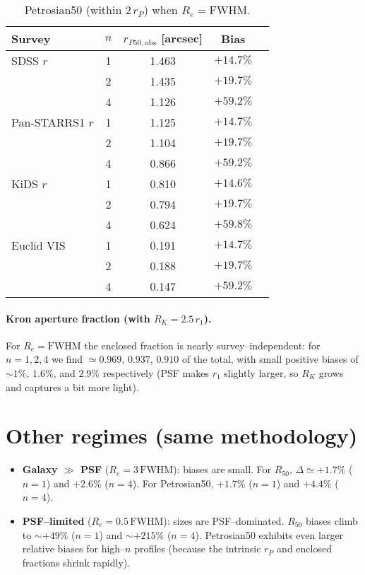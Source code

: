 \documentclass[12pt]{article}
\begin{document}
\begin{table}[t]
\centering
\small
\caption{Petrosian50 (within $2\,r_P$) when $R_e=\mathrm{FWHM}$.}
\begin{tabular}{lcccc}
\hline
Survey & $n$ & $r_{P50,\mathrm{obs}}$ [arcsec] & Bias \\
\hline
SDSS $r$ & 1 & 1.463 & $+14.7\%$ \\
         & 2 & 1.435 & $+19.7\%$ \\
         & 4 & 1.126 & $+59.2\%$ \\
Pan-STARRS1 $r$ & 1 & 1.125 & $+14.7\%$ \\
                 & 2 & 1.104 & $+19.7\%$ \\
                 & 4 & 0.866 & $+59.2\%$ \\
KiDS $r$ & 1 & 0.810 & $+14.6\%$ \\
         & 2 & 0.794 & $+19.7\%$ \\
         & 4 & 0.624 & $+59.8\%$ \\
Euclid VIS & 1 & 0.191 & $+14.7\%$ \\
           & 2 & 0.188 & $+19.7\%$ \\
           & 4 & 0.147 & $+59.2\%$ \\
\hline
\end{tabular}
\end{table}

\paragraph{Kron aperture fraction (with $R_K=2.5\,r_1$).}
For $R_e=\mathrm{FWHM}$ the enclosed fraction is nearly survey–independent: for $n=1,2,4$ we find $\simeq 0.969,\,0.937,\,0.910$ of the total, with small positive biases of $\sim 1\%$, $1.6\%$, and $2.9\%$ respectively (PSF makes $r_1$ slightly larger, so $R_K$ grows and captures a bit more light).

\section*{Other regimes (same methodology)}
\begin{itemize}
\item \textbf{Galaxy $\gg$ PSF} ($R_e=3\,\mathrm{FWHM}$): biases are small. For $R_{50}$, $\Delta\simeq+1.7\%$ ($n{=}1$) and $+2.6\%$ ($n{=}4$). For Petrosian50, $+1.7\%$ ($n{=}1$) and $+4.4\%$ ($n{=}4$).
\item \textbf{PSF–limited} ($R_e=0.5\,\mathrm{FWHM}$): sizes are PSF–dominated. $R_{50}$ biases climb to $\sim+49\%$ ($n{=}1$) and $\sim+215\%$ ($n{=}4$). Petrosian50 exhibits even larger relative biases for high–$n$ profiles (because the intrinsic $r_P$ and enclosed fractions shrink rapidly).
\end{itemize}
\end{document}
